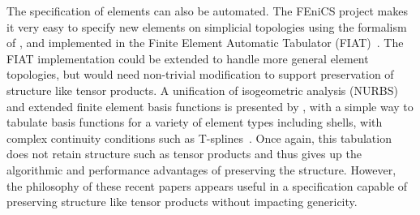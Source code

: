 The specification of elements can also be automated.
The FEniCS project makes it very easy to specify new elements on simplicial topologies using the formalism of \citet{ciarlet1978finite}, and implemented in the Finite Element Automatic Tabulator (FIAT)~\citep{kirby2004algorithm,kirby2006optimizing}.
The FIAT implementation could be extended to handle more general element topologies, but would need non-trivial modification to support preservation of structure like tensor products.
A unification of isogeometric analysis (\eg NURBS) and extended finite element basis functions is presented by \citet{benson2010isoxfem}, with a simple way to tabulate basis functions for a variety of element types including shells, with complex continuity conditions such as T-splines~\citep{sederberg2003tsplines,bazilevs2010isogeometric}.
Once again, this tabulation does not retain structure such as tensor products and thus gives up the algorithmic and performance advantages of preserving the structure.
However, the philosophy of these recent papers appears useful in a specification capable of preserving structure like tensor products without impacting genericity.

